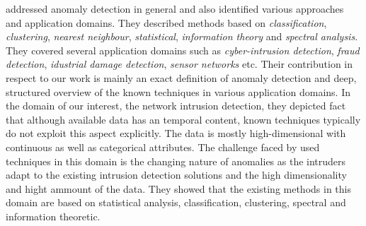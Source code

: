  \cite{chandola2009anomaly} addressed anomaly detection in general and also identified various approaches and application domains.
They described methods based on \emph{classification}, \emph{clustering}, \emph{nearest neighbour}, 
\emph{statistical}, \emph{information theory} and \emph{spectral analysis}. 
They covered several application domains such as \emph{cyber-intrusion detection}, \emph{fraud detection}, 
\emph{idustrial damage detection}, \emph{sensor networks} etc. 
Their contribution in respect to our work is mainly an exact definition of anomaly detection and deep, 
structured overview of the known techniques in various application domains. In the domain of our interest, the network intrusion detection, 
they depicted fact that although available data has an temporal content, known techniques typically do not exploit this aspect explicitly. 
The data is mostly high-dimensional with continuous as well as categorical attributes. The challenge faced by used techniques in this domain is the changing nature of anomalies as the intruders adapt to the existing intrusion detection solutions and the high dimensionality and hight ammount of
the data. They showed that the existing methods in this domain are based on statistical analysis, classification, clustering, spectral and information theoretic.
%
